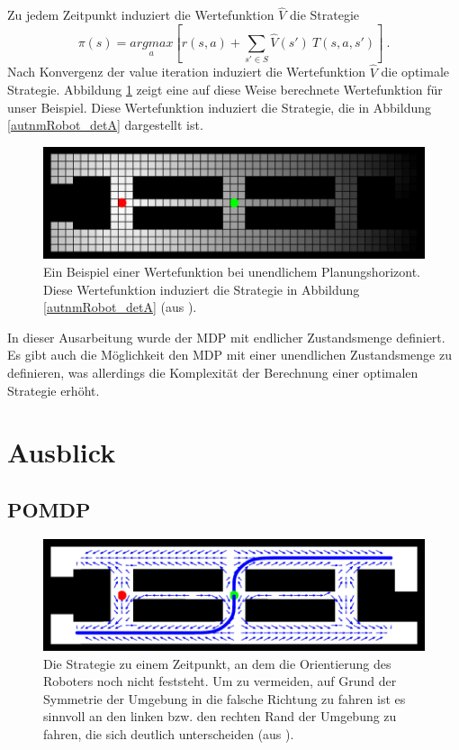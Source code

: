 \documentclass[a4paper]{IEEEtran}
\begin{document}
Zu jedem Zeitpunkt induziert die Wertefunktion $\hat{V}$ die Strategie
\begin{equation}
	\pi(s) = \underset{a}{argmax} \left[ r(s,a) + \sum_{s' \in S} \hat{V}(s')\ T(s, a, s') \right]\ .
\end{equation}
Nach Konvergenz der value iteration induziert die Wertefunktion $\hat{V}$ die optimale Strategie.
Abbildung \ref{autnmRobot_policy} zeigt eine auf diese Weise berechnete Wertefunktion für unser Beispiel. Diese Wertefunktion induziert die Strategie, die in Abbildung \ref{autnmRobot_detA} dargestellt ist.
\begin{figure}[ht]
	\centering
	\includegraphics[scale=0.72]{images/autnmRobot_MDPValueFunction.png}
	\caption{Ein Beispiel einer Wertefunktion bei unendlichem Planungshorizont. Diese Wertefunktion induziert die Strategie in Abbildung \ref{autnmRobot_detA} (aus \cite{thrun2005probabilistic}).}
	\label{autnmRobot_policy}
\end{figure}

In dieser Ausarbeitung wurde der MDP mit endlicher Zustandsmenge definiert. Es gibt auch die Möglichkeit den MDP mit einer unendlichen Zustandsmenge zu definieren, was allerdings die Komplexität der Berechnung einer optimalen Strategie erhöht. 


\section{Ausblick}
\label{sec:pomdp}
\subsection{POMDP}
\begin{figure}[ht]
	\centering
	\includegraphics[scale=0.72]{images/autnmRobot_POMDPPathA.png}
	\caption{Die Strategie zu einem Zeitpunkt, an dem die Orientierung des Roboters noch nicht feststeht. Um zu vermeiden, auf Grund der Symmetrie der Umgebung in die falsche Richtung zu fahren ist es sinnvoll an den linken bzw. den rechten Rand der Umgebung zu fahren, die sich deutlich unterscheiden (aus \cite{thrun2005probabilistic}).}
	\label{autnmRobot_POMDPPathA}
\end{figure}
\end{document}
